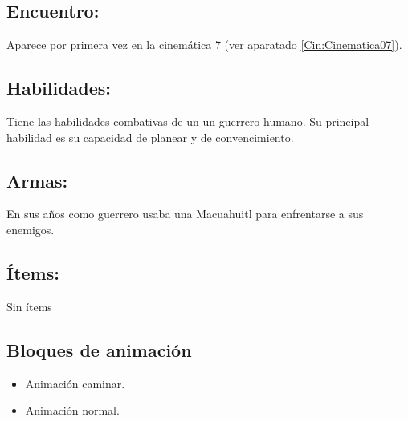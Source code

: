 \subsection{Encuentro:}
Aparece por primera vez en la cinemática 7 (ver aparatado \ref{Cin:Cinematica07}).
\subsection{Habilidades:}
Tiene las habilidades combativas de un un guerrero humano. Su principal habilidad es su capacidad de planear y de convencimiento.
\subsection{Armas:}
En sus años como guerrero usaba una Macuahuitl para enfrentarse a sus enemigos.
\subsection{Ítems:}
Sin ítems
\subsection{Bloques de animación}
\begin{itemize}
	\item Animación caminar.
	\item Animación normal.
\end{itemize}